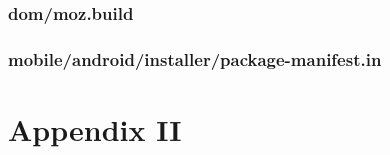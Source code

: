 \documentclass[12pt]{article}
\begin{document}
\subsubsection{dom/moz.build}

\pagebreak

\subsubsection{mobile/android/installer/package-manifest.in}

\pagebreak

\section{Appendix II}
\end{document}
